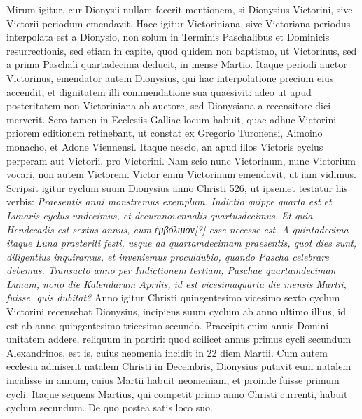 Mirum
igitur, cur Dionysii nullam fecerit mentionem, si Dionysius
Victorini, sive Victorii periodum emendavit.
Haec igitur Victoriniana,
sive Victoriana periodus interpolata est a Dionysio, non solum
in Terminis Paschalibus et Dominicis resurrectionis, sed etiam
in capite, quod quidem non baptismo, ut Victorinus, sed a prima
Paschali quartadecima deducit, in mense Martio.
Itaque periodi
auctor Victorinus, emendator autem Dionysius, qui hac interpolatione
precium eius accendit, et dignitatem illi commendatione
sua quaesivit: adeo ut apud posteritatem non Victoriniana ab auctore,
sed Dionysiana a recensitore dici merverit.
Sero tamen in Ecclesiis
Galliae locum habuit, quae adhuc Victorini priorem editionem
retinebant, ut constat ex Gregorio Turonensi, Aimoino monacho,
et Adone Viennensi.
Itaque nescio, an apud illos Victoris
cyclus perperam aut Victorii, pro Victorini.
Nam scio nunc Victorinum,
nunc Victorium vocari, non autem Victorem.
Victor
enim Victorinum emendavit, ut iam vidimus.
Scripsit igitur cyclum
suum Dionysius anno Christi 526, ut ipsemet testatur his verbis:
\textit{Praesentis anni monstremus exemplum.}
\textit{Indictio quippe quarta est
et Lunaris cyclus undecimus, et decumnovennalis quartusdecimus.}
\textit{Et quia Hendecadis est sextus annus,
 eum \textgreek{ἐμβόλιμον[?]} esse necesse est.}
\textit{A quintadecima itaque Luna praeteriti festi,
 usque ad quartamdecimam
praesentis, quot dies sunt, diligentius inquiramus, et inveniemus proculdubio,
quando Pascha celebrare debemus.}
\textit{Transacto anno per Indictionem
tertiam, Paschae quartamdeciman Lunam, nono die Kalendarum
Aprilis, id est vicesimaquarta die mensis Martii, fuisse,
quis dubitat?}
Anno igitur Christi quingentesimo vicesimo sexto
cyclum Victorini recensebat Dionysius, incipiens suum cyclum ab
anno ultimo illius, id est ab anno quingentesimo tricesimo secundo.
Praecipit enim annis Domini unitatem addere,
 reliquum in  partiri:
quod scilicet annus primus cycli secundum Alexandrinos, est
is, cuius neomenia incidit in 22 diem Martii.
Cum autem ecclesia
admiserit natalem Christi in  Decembris, Dionysius putavit
eum natalem incidisse in annum, cuius  Martii habuit
neomeniam, et proinde fuisse primum cycli.
Itaque sequens Martius,
qui competit primo anno Christi currenti, habuit cyclum secundum.
%
De quo postea satis loco suo.
